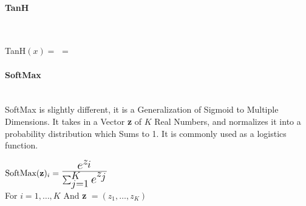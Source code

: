 \begin{flushleft}
                \paragraph*{TanH} \mbox{} \\
                    \begin{center}
                        TanH$(x) = $  $ = $  \\
                        \vspace{0.4cm}
                    \end{center}

                \paragraph{SoftMax} \mbox{} \\
                    SoftMax is slightly different, it is a Generalization of Sigmoid to Multiple Dimensions. It takes in a Vector 
                    \textbf{z} of $K$ Real Numbers, and normalizes it into a probability distribution which Sums to 1. It is commonly used as
                    a logistics function.\\ 

                    \begin{center}
                        \begin{math}
                            \text{SoftMax}(\textbf{z})_{i} = \mathLarge{\frac{e^{z_{i}}}{\sum_{j=1}^{K} e^{z_{j}}}}
                        \end{math} \\
                        \vspace{0.2cm}
                        For $i = 1, \hdots,K$ And \textbf{z} $ = (z_{1},\hdots,z_{K})$ \\
                    \end{center}           

\end{flushleft}
